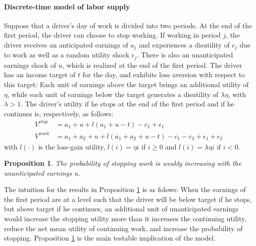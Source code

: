\documentclass[reviewmode,AEJ]{AEA}
\newtheorem{proposition}{Proposition}
\begin{document}
\paragraph{Discrete-time model of labor supply} Suppose that a driver's day of work is divided into two periods.
At the end of the first period, the driver can choose to stop working. If working in period $j$, the driver
receives an anticipated earnings of $a_j$ and experiences a disutility of $c_j$ due to work as well as a
random utility shock $\epsilon_j$. There is also an unanticipated earnings shock of $u$, which is realized 
at the end of the first period. The driver has an income target of $t$ for the day, and exhibits loss 
aversion with respect to this target: Each unit of earnings above the target brings an additional utility
of $\eta$, while each unit of earnings below the target generates a disutility of $\lambda\eta$, 
with $\lambda > 1$. The driver's utility if he stops at the end of the first period and if he continues is, 
respectively, as follows:
\begin{align*}
V^{stop} &= a_1 + u + l(a_1+u-t) - c_1 + \epsilon_1 \\
V^{work} &= a_1 + a_2 + u + l(a_1+a_2+u-t) - c_1 - c_2 + \epsilon_1 + \epsilon_2   
\end{align*}
with $l(\cdot)$ is the loss-gain utility, $l(i) = \eta i$ if $i\geq0$ and $l(i) = \lambda\eta i$ if $i<0$. 
\begin{proposition}
\label{prop:unanticipated}
The probability of stopping work is weakly increasing with the unanticipated earnings $u$.
\end{proposition}


The intuition for the results in Proposition \ref{prop:unanticipated} is as folows: When the earnings of 
the first period are at a level such that the driver will be below target if he stops, but above target if
he continues, an additional unit of unanticipated earnings would increase the stopping utility more than it
increases the continuing utility, reduce the net mean utility of continuing work, and increase the
probability of stopping. Proposition \ref{prop:unanticipated} is the main testable implication of the model.
\end{document}
